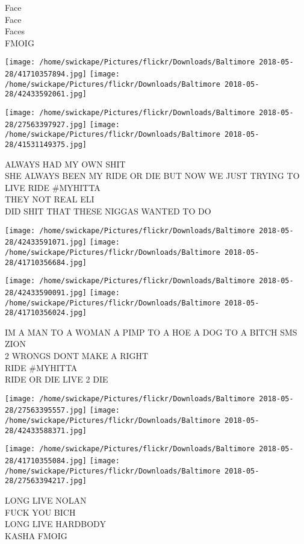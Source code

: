 \documentclass[10pt,letterpaper]{article}
\begin{document}
Face\\
Face\\
Faces\\
FMOIG\\
\pagebreak

\texttt{[image: /home/swickape/Pictures/flickr/Downloads/Baltimore 2018-05-28/41710357894.jpg]}
\texttt{[image: /home/swickape/Pictures/flickr/Downloads/Baltimore 2018-05-28/42433592061.jpg]}

\texttt{[image: /home/swickape/Pictures/flickr/Downloads/Baltimore 2018-05-28/27563397927.jpg]}
\texttt{[image: /home/swickape/Pictures/flickr/Downloads/Baltimore 2018-05-28/41531149375.jpg]}

ALWAYS HAD MY OWN SHIT\\
SHE ALWAYS BEEN MY RIDE OR DIE BUT NOW WE JUST TRYING TO LIVE RIDE \#MYHITTA\\
THEY NOT REAL ELI\\
DID SHIT THAT THESE NIGGAS WANTED TO DO\\
\pagebreak

\texttt{[image: /home/swickape/Pictures/flickr/Downloads/Baltimore 2018-05-28/42433591071.jpg]}
\texttt{[image: /home/swickape/Pictures/flickr/Downloads/Baltimore 2018-05-28/41710356684.jpg]}

\texttt{[image: /home/swickape/Pictures/flickr/Downloads/Baltimore 2018-05-28/42433590091.jpg]}
\texttt{[image: /home/swickape/Pictures/flickr/Downloads/Baltimore 2018-05-28/41710356024.jpg]}

IM A MAN TO A WOMAN A PIMP TO A HOE A DOG TO A BITCH SMS ZION\\
2 WRONGS DONT MAKE A RIGHT\\
RIDE \#MYHITTA\\
RIDE OR DIE LIVE 2 DIE\\
\pagebreak

\texttt{[image: /home/swickape/Pictures/flickr/Downloads/Baltimore 2018-05-28/27563395557.jpg]}
\texttt{[image: /home/swickape/Pictures/flickr/Downloads/Baltimore 2018-05-28/42433588371.jpg]}

\texttt{[image: /home/swickape/Pictures/flickr/Downloads/Baltimore 2018-05-28/41710355084.jpg]}
\texttt{[image: /home/swickape/Pictures/flickr/Downloads/Baltimore 2018-05-28/27563394217.jpg]}

LONG LIVE NOLAN\\
FUCK YOU BICH\\
LONG LIVE HARDBODY\\
KASHA FMOIG\\
\pagebreak
\end{document}
